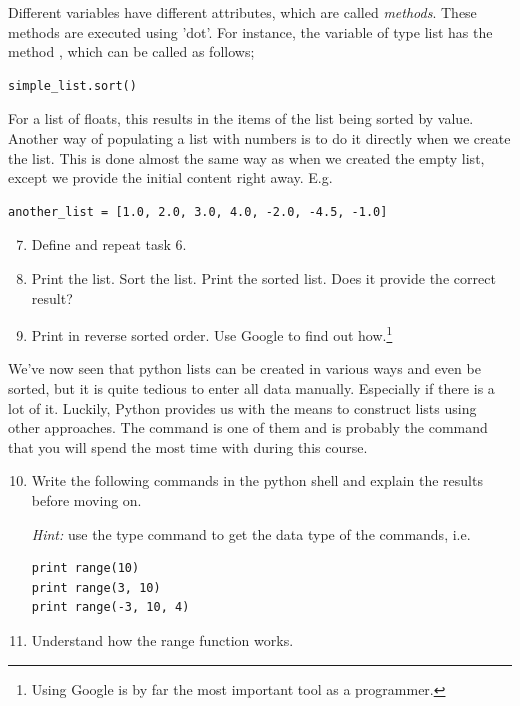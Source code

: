 \documentclass{article}
\begin{document}
Different variables have different attributes, which are called {\em methods}.
These methods are executed using 'dot'.
For instance,
the variable of type list has the method ,
which can be called as follows;

\begin{lstlisting}
simple_list.sort()
\end{lstlisting}

For a list of floats, this results in the items of the list being sorted by value.\\

Another way of populating a list with numbers is to do it directly when
we create the list.
This is done almost the same way as when we created the empty list, except we
provide the initial content right away. E.g.

\begin{lstlisting}
another_list = [1.0, 2.0, 3.0, 4.0, -2.0, -4.5, -1.0]
\end{lstlisting}


\begin{enumerate}
  \setcounter{enumi}{6}
  \item Define  and repeat task 6.

  \item Print the list. Sort the list. Print the sorted list.
  Does it provide the correct result?

  \item Print  in reverse sorted order.
    Use Google to find out how.\footnote{Using Google is
    by far the most important tool as a programmer.}
\end{enumerate}


We've now seen that python lists can be created in various ways and even be
sorted, but it is quite tedious to enter all data manually. Especially if
there is a lot of it.
Luckily, Python provides us with the means to construct
lists using other approaches.
The  command is one of them and is probably the
command that you will spend the most time with during this course.

\begin{enumerate}
  \setcounter{enumi}{9}
  \item Write the following commands in the python shell and explain the results
    before moving on.

    {\em Hint:} use the type command to get the data type of the commands,
    i.e. 

\begin{lstlisting}
print range(10)
print range(3, 10)
print range(-3, 10, 4)
\end{lstlisting}

  \item Understand how the range function works.
\end{enumerate}
\end{document}
